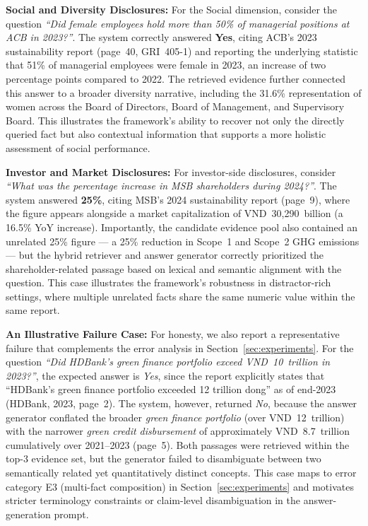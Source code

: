 \documentclass[sn-mathphys, oneside]{sn-jnl}
\begin{document}
\textbf{Social and Diversity Disclosures: }For the Social dimension, consider the question \textit{``Did female
employees hold more than 50\% of managerial positions at ACB in 2023?''}.
The system correctly answered \textbf{Yes}, citing ACB's 2023 sustainability
report (page~40, GRI~405-1) and reporting the underlying statistic that
51\% of managerial employees were female in 2023, an increase of two
percentage points compared to 2022. The retrieved evidence further
connected this answer to a broader diversity narrative, including the
31.6\% representation of women across the Board of Directors, Board of
Management, and Supervisory Board. This illustrates the framework's ability
to recover not only the directly queried fact but also contextual
information that supports a more holistic assessment of social performance.
 
\textbf{Investor and Market Disclosures:} For investor-side disclosures, consider \textit{``What was the percentage
increase in MSB shareholders during 2024?''}. The system answered
\textbf{25\%}, citing MSB's 2024 sustainability report (page~9), where the
figure appears alongside a market capitalization of VND~30{,}290~billion
(a 16.5\% YoY increase). Importantly, the candidate evidence pool also
contained an unrelated 25\% figure --- a 25\% reduction in Scope~1 and
Scope~2 GHG emissions --- but the hybrid retriever and answer generator
correctly prioritized the shareholder-related passage based on lexical and
semantic alignment with the question. This case illustrates the
framework's robustness in distractor-rich settings, where multiple
unrelated facts share the same numeric value within the same report.
 
\textbf{An Illustrative Failure Case: }For honesty, we also report a representative failure that complements the
error analysis in Section~\ref{sec:experiments}. For the question
\textit{``Did HDBank's green finance portfolio exceed VND~10~trillion in
2023?''}, the expected answer is \textit{Yes}, since the report explicitly
states that ``HDBank's green finance portfolio exceeded 12 trillion dong''
as of end-2023 (HDBank, 2023, page~2). The system, however, returned
\textit{No}, because the answer generator conflated the broader
\textit{green finance portfolio} (over VND~12~trillion) with the narrower
\textit{green credit disbursement} of approximately VND~8.7~trillion
cumulatively over 2021--2023 (page~5). Both passages were retrieved
within the top-3 evidence set, but the generator failed to disambiguate
between two semantically related yet quantitatively distinct concepts.
This case maps to error category E3 (multi-fact composition) in
Section~\ref{sec:experiments} and motivates stricter terminology
constraints or claim-level disambiguation in the answer-generation prompt.
 
\end{document}
